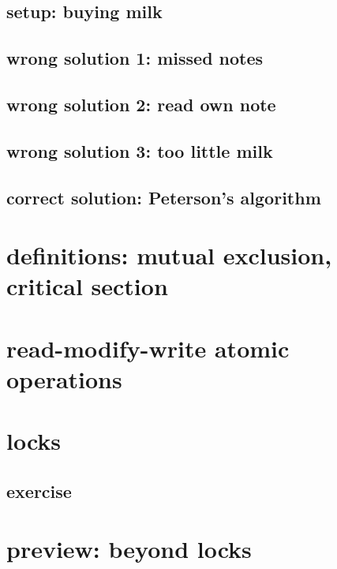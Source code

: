 \subsection{setup: buying milk}


\subsection{wrong solution 1: missed notes}


\subsection{wrong solution 2: read own note}


\subsection{wrong solution 3: too little milk}


\subsection{correct solution: Peterson's algorithm}


\section{definitions: mutual exclusion, critical section}


\section{read-modify-write atomic operations}


\section{locks}


\subsection{exercise}


\section{preview: beyond locks}


